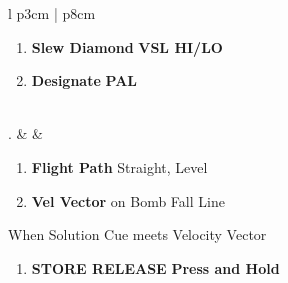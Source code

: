 \documentclass[8pt,usenames,dvipsnames,twoside]{article}
\begin{document}
\begin{center}
\begin{tabular}{l p{3cm} | p{8cm}}
\begin{minipage}[t]{\linewidth}
\begin{enumerate}[label=(\alph*)]
						\item \textbf{Slew Diamond} \dotfill \textbf{VSL HI/LO}
						\item \textbf{Designate} \dotfill \textbf{PAL}
					\end{enumerate}
				\end{minipage} \\
				. &  &
				\begin{minipage}[t]{\linewidth}
					\vspace{-7pt}
					\begin{enumerate}[label=(\alph*)]
						\item \textbf{Flight Path} \dotfill Straight, Level
						\item \textbf{Vel Vector} \dotfill on Bomb Fall Line
					\end{enumerate}
					When Solution Cue meets Velocity Vector
					\begin{enumerate}[label=(\alph*), resume]
						\item \textbf{STORE RELEASE} \dotfill \textbf{Press and Hold}
					\end{enumerate}
				\end{minipage} \\
				\bottomrule
			\end{tabular}
		\end{center}	
		
		\clearpage 
		
\end{document}
